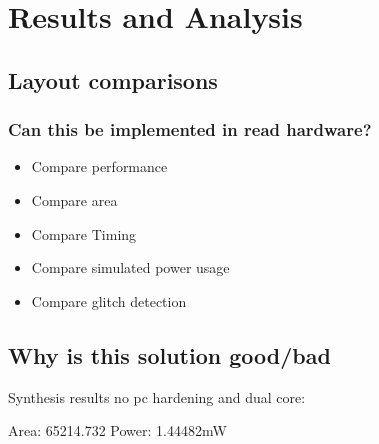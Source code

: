 \chapter{Results and Analysis}
\label{chap5}

\section{Layout comparisons}

\subsection{Can this be implemented in read hardware?}
\begin{itemize}
    \item Compare performance 
    \item Compare area
    \item Compare Timing 
    \item Compare simulated power usage
    \item Compare glitch detection
\end{itemize}

\section{Why is this solution good/bad}

Synthesis results no pc hardening and dual core:

Area: 65214.732
Power: 1.44482mW
